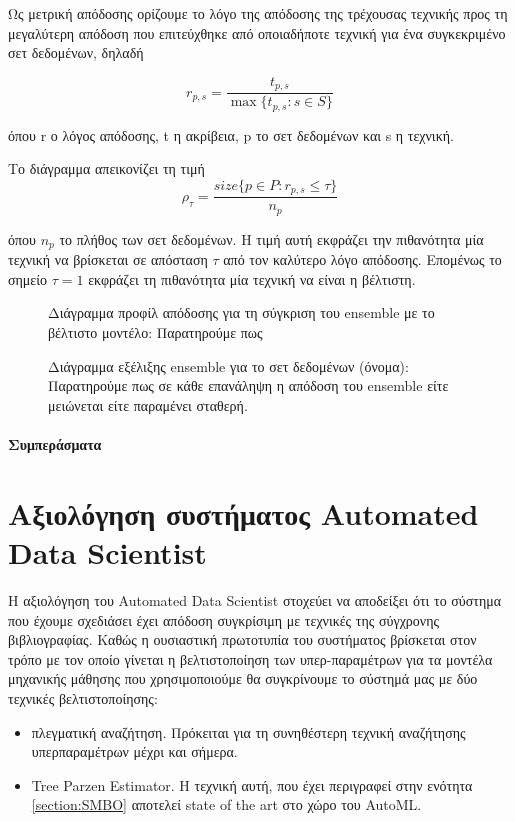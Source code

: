 Ως μετρική απόδοσης ορίζουμε το λόγο της απόδοσης της τρέχουσας τεχνικής προς τη μεγαλύτερη απόδοση που επιτεύχθηκε από οποιαδήποτε τεχνική για ένα συγκεκριμένο σετ δεδομένων, δηλαδή

\begin{equation}
r_{p,s}= \frac{t_{p,s}}{\max\{{t_{p,s} : s \in S}\}}    
\end{equation} 

όπου r ο λόγος απόδοσης, t η ακρίβεια, p το σετ δεδομένων και s η τεχνική.

Το διάγραμμα απεικονίζει τη τιμή
\begin{equation}
\rho_{\tau}= \frac{size\{{p \in P : r_{p,s} \leq \tau  }\}}{n_p}   
\end{equation}

όπου $n_p$ το πλήθος των σετ δεδομένων. Η τιμή αυτή εκφράζει την πιθανότητα μία τεχνική να βρίσκεται σε απόσταση $\tau$ από τον καλύτερο λόγο απόδοσης.  Επομένως το σημείο $\tau = 1$ εκφράζει τη πιθανότητα μία τεχνική να είναι η βέλτιστη.


\begin{figure}[!htb]
	\begin{center}
		\caption[Διάγραμμα προφίλ απόδοσης για τη σύγκριση του ensemble με το βέλτιστο μοντέλο]{Διάγραμμα προφίλ απόδοσης για τη σύγκριση του ensemble με το βέλτιστο μοντέλο: Παρατηρούμε πως }
	\end{center}
\end{figure}

\begin{figure}[!htb]
	\begin{center}
		\caption[Διάγραμμα εξέλιξης ensemble για το σετ δεδομένων (όνομα)]{Διάγραμμα εξέλιξης ensemble για το σετ δεδομένων (όνομα): Παρατηρούμε πως σε κάθε επανάληψη η απόδοση του ensemble είτε μειώνεται είτε παραμένει σταθερή. }
	\end{center}
\end{figure} 	

\paragraph{Συμπεράσματα}
\section{Αξιολόγηση συστήματος Automated Data Scientist}\label{section:eval_system}
Η αξιολόγηση του Automated Data Scientist στοχεύει να αποδείξει ότι το σύστημα που έχουμε σχεδιάσει έχει απόδοση συγκρίσιμη με τεχνικές της σύγχρονης βιβλιογραφίας. Καθώς η ουσιαστική πρωτοτυπία του συστήματος βρίσκεται στον τρόπο με τον οποίο γίνεται η βελτιστοποίηση των υπερ-παρα\-μέ\-τρων για τα μοντέλα μηχανικής μάθησης που χρησιμοποιούμε θα συγκρίνουμε το σύστημά μας με δύο τεχνικές βελτιστοποίησης:
\begin{itemize}
	\item πλεγματική αναζήτηση. Πρόκειται για τη συνηθέστερη τεχνική αναζήτησης υπερ\-παραμέτρων μέχρι και σήμερα.
	\item Tree Parzen Estimator. Η τεχνική αυτή, που έχει περιγραφεί στην ενότητα \ref{section:SMBO} αποτελεί state of the art στο χώρο του AutoML.
\end{itemize}

